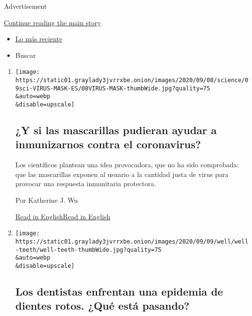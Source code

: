 Advertisement

\protect\hyperlink{after-mid1}{Continue reading the main story}

\begin{itemize}
\tightlist
\item
  \protect\hyperlink{stream-panel}{Lo más reciente}
\item
  Buscar
\end{itemize}

\begin{enumerate}
\def\labelenumi{\arabic{enumi}.}
\item
  \href{/es/2020/09/09/espanol/ciencia-y-tecnologia/vacuna-cruda-mascarilla-coronavirus.html}{}

  \texttt{[image: https://static01.graylady3jvrrxbe.onion/images/2020/09/08/science/09sci-VIRUS-MASK-ES/08VIRUS-MASK-thumbWide.jpg?quality=75\\\&auto=webp\\\&disable=upscale]}

  \hypertarget{y-si-las-mascarillas-pudieran-ayudar-a-inmunizarnos-contra-el-coronavirus}{%
  \subsection{¿Y si las mascarillas pudieran ayudar a inmunizarnos
  contra el
  coronavirus?}\label{y-si-las-mascarillas-pudieran-ayudar-a-inmunizarnos-contra-el-coronavirus}}

  Los científicos plantean una idea provocadora, que no ha sido
  comprobada: que las mascarillas exponen al usuario a la cantidad justa
  de virus para provocar una respuesta inmunitaria protectora.

  Por Katherine J. Wu

  \href{https://www.nytimes3xbfgragh.onion/2020/09/08/health/covid-masks-immunity.html}{Read
  in
  English}\href{https://www.nytimes3xbfgragh.onion/2020/09/08/health/covid-masks-immunity.html}{Read
  in English}
\item
  \href{/es/2020/09/08/espanol/ciencia-y-tecnologia/dentistas-covid-dientes.html}{}

  \texttt{[image: https://static01.graylady3jvrrxbe.onion/images/2020/09/09/well/well-teeth/well-teeth-thumbWide.jpg?quality=75\\\&auto=webp\\\&disable=upscale]}

  \hypertarget{los-dentistas-enfrentan-una-epidemia-de-dientes-rotos-quuxe9-estuxe1-pasando}{%
  \subsection{Los dentistas enfrentan una epidemia de dientes rotos.
  ¿Qué está
  pasando?}\label{los-dentistas-enfrentan-una-epidemia-de-dientes-rotos-quuxe9-estuxe1-pasando}}


\end{enumerate}
